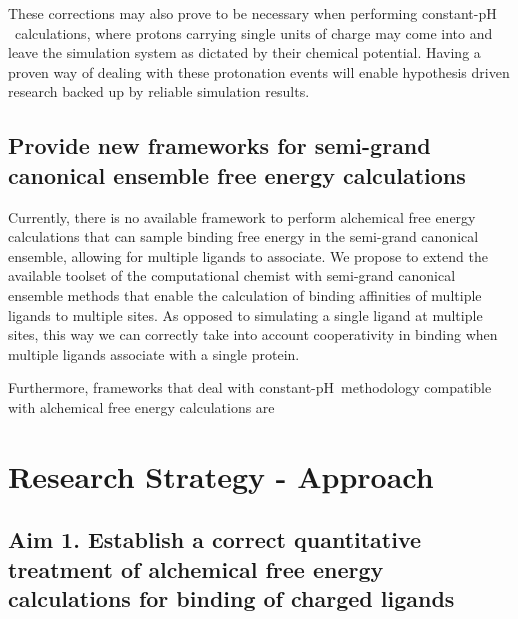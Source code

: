 \documentclass[10pt,final]{article}
\newif\ifinstr
\newcommand{\instr}[1]{\ifdraft{\ifinstr {\color{cyan}\emph{#1}} \fi}{}}
\newcommand{\pH}{p$\mathrm{H}$\ }
\begin{document}
These corrections may also prove to be necessary when performing constant-\pH calculations, where protons carrying single units of charge may come into and leave the simulation system as dictated by their chemical potential. Having a proven way of dealing with these protonation events will enable hypothesis driven research backed up by reliable simulation results.


\subsection*{Provide new frameworks for semi-grand canonical ensemble free energy calculations}
Currently, there is no available framework to perform alchemical free energy calculations that can sample binding free energy in the semi-grand canonical ensemble, allowing for multiple ligands to associate. We propose to extend the available toolset of the computational chemist with semi-grand canonical ensemble methods that enable the calculation of binding affinities of multiple ligands to multiple sites. As opposed to simulating a single ligand at multiple sites, this way we can correctly take into account cooperativity in binding when multiple ligands associate with a single protein.

Furthermore, frameworks that deal with constant-\pH methodology compatible with alchemical free energy calculations are 


\section*{Research Strategy - Approach}
\instr{Approach: More specific background information. Describe in detail the experimental design and research methods to be used. Technical hurdles to be overcome should be mentioned. Alternative approaches should be given for experiments that may not be feasible. Discussion of expected or possible results and their interpretation. Best format for each specific aim: a) rationale, b) methods, c) expected results, d) alternatives. Theory aims should follow a similar structure where possible.}


\subsection*{Aim 1. Establish a correct quantitative treatment of alchemical free energy calculations for binding of charged ligands}
\end{document}
